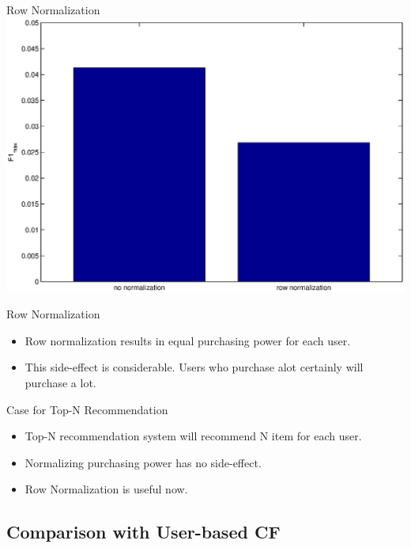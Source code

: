 \documentclass{beamer}
\begin{document}
\begin{frame}{Row Normalization}
\includegraphics[width=\linewidth]{./row_norm_f1.eps}
\end{frame}


\begin{frame}{Row Normalization}

\begin{itemize}
\item Row normalization results in equal purchasing power for each user.
\item This side-effect is considerable. Users who purchase alot certainly will purchase a lot.
\end{itemize}

\begin{alertblock}{Case for Top-N Recommendation}
\begin{itemize}
\item Top-N recommendation system will recommend N item for each user.
\item Normalizing purchasing power has no side-effect.
\item Row Normalization is useful now.
\end{itemize}
\end{alertblock}

\end{frame}


\subsection{Comparison with User-based CF}
\end{document}
